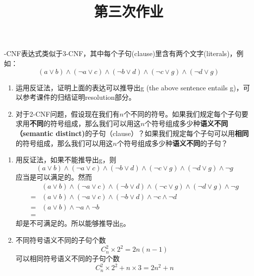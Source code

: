 \endofdump
{}

    \title{第三次作业}
    \maketitle
\begin{problem}
-CNF表达式类似于3-CNF，其中每个子句(clause)里含有两个文字(literals)，例如：
$$(a\lor b)\land (\lnot a \lor c)\land (\lnot b \lor d)\land(\lnot c \lor g)\land (\lnot d \lor g)$$
\begin{enumerate}
    \item 运用反证法，证明上面的表达可以推导出g (the above sentence entails g)，可以参考课件的归结证明resolution部分。
    \item 对于2-CNF问题，假设现在我们有$n$个不同的符号。如果我们规定每个子句要求用\textbf{不同}的符号组成，那么我们可以用这$n$个符号组成多少种\textbf{语义不同（semantic distinct)}的子句（clause）？如果我们规定每个子句可以用\textbf{相同}的符号组成，那么我们可以用这$n$个符号组成多少种\textbf{语义不同}的子句？
\end{enumerate}
\end{problem}

\begin{solution}
    \begin{enumerate}
        \item 用反证法，如果不能推导出g，则
        \begin{equation*}
            (a\lor b)\land (\lnot a \lor c)\land (\lnot b \lor d)\land(\lnot c \lor g)\land (\lnot d \lor g) \land \neg g
        \end{equation*}
        应当是可以满足的。然而
        \begin{align*}
            &(a\lor b)\land (\lnot a \lor c)\land (\lnot b \lor d)\land(\lnot c \lor g)\land (\lnot d \lor g) \land \neg g \\
            =& (a\lor b)\land (\lnot a \lor c)\land (\lnot b \lor d)\land \lnot c \land \lnot d\\
            =&  (a\lor b)\land \lnot a \land \lnot b\\
            =&  
        \end{align*}
        却是不可满足的。所以能够推导出g。
        \item 不同符号语义不同的子句个数
        \begin{equation*}
            C_{n}^2\times 2^2 = 2n(n-1)
        \end{equation*}
        可以相同符号语义不同的子句个数
        \begin{equation*}
            C_{n}^2\times 2^2 + n\times 3 = 2n^2 + n
        \end{equation*}
    \end{enumerate}
\end{solution}

